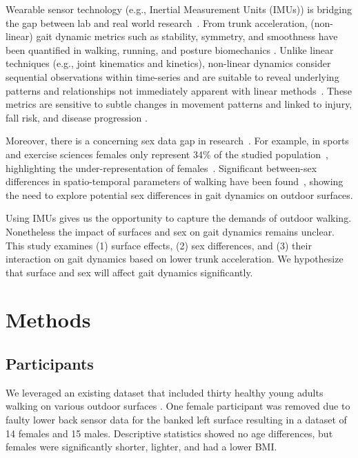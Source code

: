 \documentclass[authoryear,preprint,review,12pt]{elsarticle}
\begin{document}
Wearable sensor technology (e.g., Inertial Measurement Units (IMUs)) is bridging the gap between lab and real world research~\citep{luo_database_2020, ippersiel_impact_2022, schutte_influence_2018, hafer2023challenges}. From trunk acceleration, (non-linear) gait dynamic metrics such as stability, symmetry, and smoothness have been quantified in walking, running, and posture biomechanics \citep{svenningsen_narrative_2020, kiely_smoothness_2019, bruijn_estimating_2010, menz_acceleration_2003, moe2004estimation, emmerzaal_movement_2022, dixon_late-cueing_2018, schutte_influence_2018}. Unlike linear techniques (e.g., joint kinematics and kinetics), non-linear dynamics consider sequential observations within time-series and are suitable to reveal underlying patterns and relationships not immediately apparent with linear methods~\citep{stergiou_nonlinear_2016}. These metrics are sensitive to subtle changes in movement patterns and linked to injury, fall risk, and disease progression \citep{stergiou_human_2011, svenningsen_narrative_2020}.

Moreover, there is a concerning sex data gap in research~\citep{perez2019invisible}. For example, in sports and exercise sciences females only represent 34\% of the studied population~\citep{cowley2021invisible}, highlighting the under-representation of females~\citep{perez2019invisible, cowley2021invisible}. Significant between-sex differences in spatio-temporal parameters of walking have been found~\citep{auvinet2002reference}, showing the need to explore potential sex differences in gait dynamics on outdoor surfaces.

Using IMUs gives us the opportunity to capture the demands of outdoor walking. Nonetheless the impact of surfaces and sex on gait dynamics remains unclear. This study examines (1) surface effects, (2) sex differences, and (3) their interaction on gait dynamics based on  lower trunk acceleration. We hypothesize that surface and sex will affect gait dynamics significantly. 

\section{Methods}
\label{methods}
\subsection{Participants}
We leveraged an existing dataset that included thirty healthy young adults walking on various outdoor surfaces \citep{luo_database_2020}.
One female participant was removed due to faulty lower back sensor data for the banked left surface resulting in a dataset of 14 females and 15 males. Descriptive statistics showed no age differences, but females were significantly shorter, lighter, and had a lower BMI. 
\end{document}
